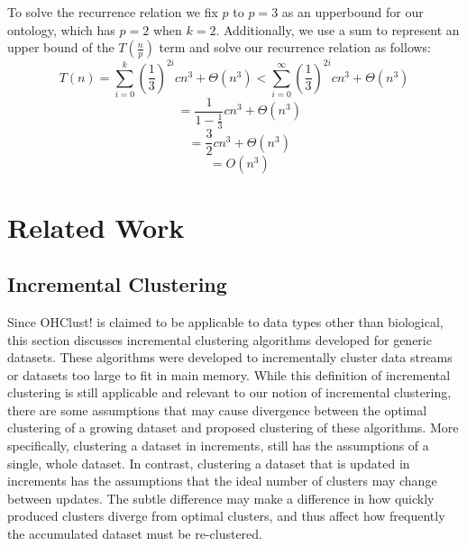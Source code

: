 \documentclass[12pt]{ucthesis}
\begin{document}
      To solve the recurrence relation we fix $p$ to $p=3$ as an upperbound for
      our ontology, which has $p=2$ when $k=2$. Additionally, we use a sum to
      represent an upper bound of the $T(\frac{n}{p})$ term and solve our
      recurrence relation as follows:
      $$
        T(n) = \sum_{i=0}^{k}(\frac{1}{3})^{2i} cn^{3} + \Theta(n^{3})
             < \sum_{i=0}^{\infty}(\frac{1}{3})^{2i} cn^{3} + \Theta(n^{3})
      $$
      $$\;\;\;= \frac{1}{1-\frac{1}{3}} cn^{3} + \Theta(n^{3})$$
      $$\;\;\;= \frac{3}{2} cn^{3} + \Theta(n^{3})$$
      $$\;\;\;= O(n^{3})$$

\chapter{Related Work}\label{chap:related}
   \section{Incremental Clustering}\label{sec:incr_cluster}
   Since \textsf{OHClust!} is claimed to be applicable to data types other than
   biological, this section discusses incremental clustering algorithms
   developed for generic datasets. These algorithms were developed to
   incrementally cluster data streams or datasets too large to fit in main
   memory. While this definition of incremental clustering is still applicable
   and relevant to our notion of incremental clustering, there are some
   assumptions that may cause divergence between the optimal clustering of a
   growing dataset and proposed clustering of these algorithms. More
   specifically, clustering a dataset in increments, still has the assumptions
   of a single, whole dataset. In contrast, clustering a dataset that is
   updated in increments has the assumptions that the ideal number of clusters
   may change between updates. The subtle difference may make a difference in
   how quickly produced clusters diverge from optimal clusters, and thus affect
   how frequently the accumulated dataset must be re-clustered.
\end{document}
